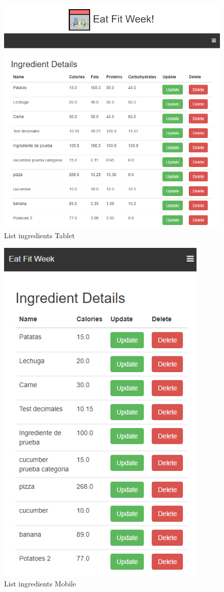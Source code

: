 \documentclass[12pt, a4paper, twoside]{book}
\begin{document}
	\begin{figure}[H]
		\centering
		\includegraphics[width=15cm]{Imagenes/MU-ListIngredientsTablet.png}
		\caption{List ingredients Tablet}\label{List ingredients Tablet}
	\end{figure}
	\begin{figure}[H]
		\centering
		\includegraphics[width=10cm]{Imagenes/MU-ListIngredientsMobile.png}
		\caption{List ingredients Mobile}\label{List ingredients Mobile}
	\end{figure}
\end{document}
